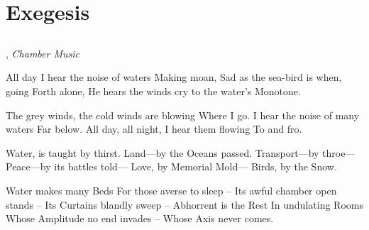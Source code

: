 \documentclass[12pt, letterpaper]{report}
\begin{document}
\part{Exegesis}

\chapter{}


\author{James Joyce}, \textit{Chamber Music}

\begin{poem}
\begin{stanza}
All day I hear the noise of waters\verseline
Making moan,\verseline
Sad as the sea-bird is when, going\verseline
Forth alone,\verseline
He hears the winds cry to the water’s\verseline
Monotone.
\end{stanza}
\begin{stanza}
The grey winds, the cold winds are blowing\verseline
Where I go.\verseline
I hear the noise of many waters\verseline
Far below.\verseline
All day, all night, I hear them flowing\verseline
To and fro.
\end{stanza}
\end{poem}

\clearpage

\author{Emily Dickinson}

\begin{poem}
\begin{stanza}
Water, is taught by thirst.\verseline
Land---by the Oceans passed.\verseline
Transport---by throe---\verseline
Peace---by its battles told---\verseline
Love, by Memorial Mold---\verseline
Birds, by the Snow.
\end{stanza}
\end{poem}

\author{Emily Dickinson}

\begin{poem}
\begin{stanza}
Water makes many Beds\verseline
For those averse to sleep --\verseline
Its awful chamber open stands --\verseline
Its Curtains blandly sweep --\verseline
Abhorrent is the Rest\verseline
In undulating Rooms\verseline
Whose Amplitude no end invades --\verseline
Whose Axis never comes.
\end{stanza}
\end{poem}

\author{by Emily Dickinson}
\end{document}
